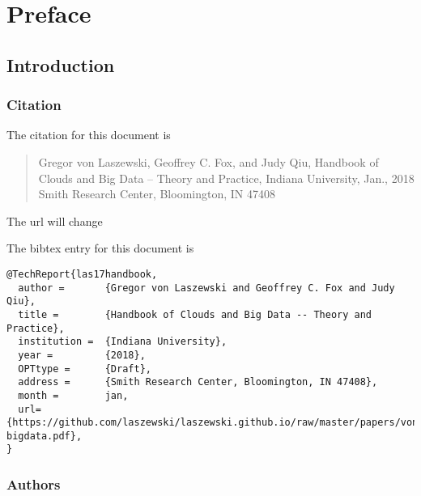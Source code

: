 
\part{Preface}




\chapter{Introduction}


\section{Citation}

The citation for this document is 

\begin{quote}

Gregor von Laszewski, Geoffrey C. Fox, and Judy Qiu, Handbook of
Clouds and Big Data -- Theory and Practice, Indiana University,
Jan., 2018
Smith Research Center, Bloomington, IN 47408
\end{quote}

\begin{WARNING}
The url will change
\end{WARNING}

The bibtex entry for this document is

\begin{verbatim}
@TechReport{las17handbook,
  author =       {Gregor von Laszewski and Geoffrey C. Fox and Judy Qiu},
  title =        {Handbook of Clouds and Big Data -- Theory and Practice},
  institution =  {Indiana University},
  year =         {2018},
  OPTtype =      {Draft},
  address =      {Smith Research Center, Bloomington, IN 47408},
  month =        jan,
  url={https://github.com/laszewski/laszewski.github.io/raw/master/papers/vonLaszewski-bigdata.pdf},
}
\end{verbatim}



\section{Authors}


